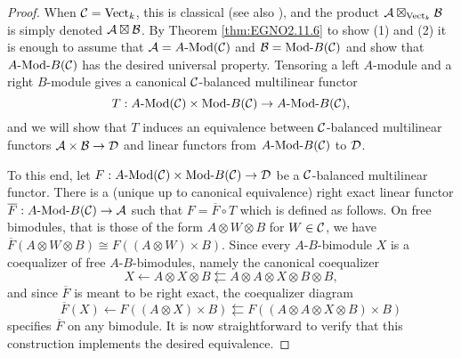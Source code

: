 \documentclass{amsart}
\begin{document}
\begin{proof}
	When $\mathcal C = \mathrm{Vect}_k$, this is classical \cite[Prop 5.13]{MR1106898} (see also \cite[Prop 1.46.2]{EGNO}), and the product $\mathcal A \boxtimes_{\mathrm{Vect}_k} \mathcal B$ is simply denoted $\mathcal A \boxtimes \mathcal B$.
	By Theorem \ref{thm:EGNO2.11.6} to show (1) and (2) it is enough to assume that $\cA = \Mod{A}{}(\cC)$ and $\cB = \Mod{}{B}(\cC)$ and show that $\Mod{A }{B}(\cC)$ has the desired universal property. Tensoring a left $A$-module and a right $B$-module gives a canonical $\mathcal C$-balanced multilinear functor 
		\begin{equation*}
			T: \Mod{A}{}(\cC) \times \Mod{}{B}(\cC) \to \Mod{A}{B}(\cC),  
		\end{equation*}
and we will show that $T$ induces an equivalence between $\mathcal C$-balanced multilinear functors $\mathcal A \times \mathcal B \to \mathcal D$ and linear functors from $\Mod{A}{B}(\cC)$ to $\mathcal D$.
	
	To this end, let $F:\Mod{A}{}(\cC) \times \Mod{}{B}(\cC) \to \cD$ be a $\mathcal C$-balanced multilinear functor. 
	There is a (unique up to canonical equivalence) right exact linear functor $\overline F: \Mod{A}{B}(\cC) \to \cA$ such that $F = \overline{F} \circ T$ which is defined as follows. On free bimodules, that is those of the form $A \otimes W \otimes B$ for $W \in \mathcal C$, we have $\overline{F}(A \otimes W \otimes B) \cong F((A \otimes W) \times B)$. Since  every $A$-$B$-bimodule $X$ is a coequalizer of free $A$-$B$-bimodules, namely the canonical coequalizer  
	\begin{equation*}
		X \leftarrow A \otimes X \otimes B \leftleftarrows A \otimes A \otimes X \otimes B \otimes B,
	\end{equation*}
	and since $\overline{F}$ is meant to be right exact, the coequalizer diagram
	\begin{equation*}
		\overline{F}(X) \leftarrow F((A \otimes X) \times B) \leftleftarrows F((A \otimes A \otimes X \otimes B) \times B)
	\end{equation*}
specifies $\overline{F}$ on any bimodule. It is now straightforward to verify that this construction implements the desired equivalence.
%	
\end{proof}
\end{document}
